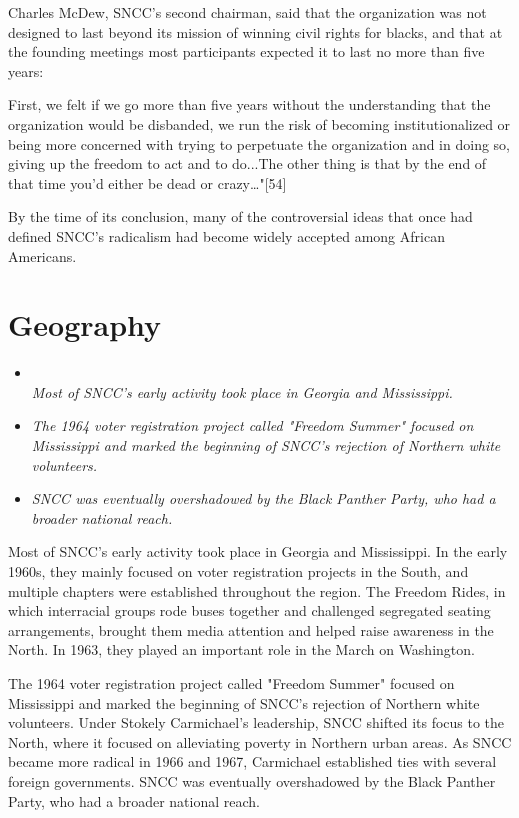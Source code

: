Charles McDew, SNCC's second chairman, said that the organization was
not designed to last beyond its mission of winning civil rights for
blacks, and that at the founding meetings most participants expected it
to last no more than five years:

First, we felt if we go more than five years without the understanding
that the organization would be disbanded, we run the risk of becoming
institutionalized or being more concerned with trying to perpetuate the
organization and in doing so, giving up the freedom to act and to
do...The other thing is that by the end of that time you'd either be
dead or crazy\ldots{}"{[}54{]}

By the time of its conclusion, many of the controversial ideas that once
had defined SNCC's radicalism had become widely accepted among African
Americans.

\section{Geography}\label{geography}

\begin{itemize}
\item
  \emph{\\[3\baselineskip]Most of SNCC's early activity took place in
  Georgia and Mississippi.}
\item
  \emph{The 1964 voter registration project called "Freedom Summer"
  focused on Mississippi and marked the beginning of SNCC's rejection of
  Northern white volunteers.}
\item
  \emph{SNCC was eventually overshadowed by the Black Panther Party, who
  had a broader national reach.}
\end{itemize}

Most of SNCC's early activity took place in Georgia and Mississippi. In
the early 1960s, they mainly focused on voter registration projects in
the South, and multiple chapters were established throughout the region.
The Freedom Rides, in which interracial groups rode buses together and
challenged segregated seating arrangements, brought them media attention
and helped raise awareness in the North. In 1963, they played an
important role in the March on Washington.

The 1964 voter registration project called "Freedom Summer" focused on
Mississippi and marked the beginning of SNCC's rejection of Northern
white volunteers. Under Stokely Carmichael's leadership, SNCC shifted
its focus to the North, where it focused on alleviating poverty in
Northern urban areas. As SNCC became more radical in 1966 and 1967,
Carmichael established ties with several foreign governments. SNCC was
eventually overshadowed by the Black Panther Party, who had a broader
national reach.

